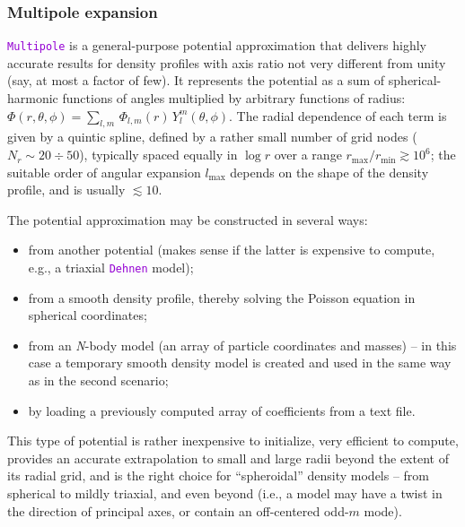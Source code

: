 \documentclass[12pt]{article}
\newcommand{\Nbody}{\textsl{N}-body\xspace}
\newcommand{\ttt}[1]{\textcolor{darkviolet}{\texttt{#1}}}
\begin{document}
\subsubsection{Multipole expansion}  \label{sec:PotentialMultipole}

\ttt{Multipole} is a general-purpose potential approximation that delivers highly accurate results for density profiles with axis ratio not very different from unity (say, at most a factor of few). It represents the potential as a sum of spherical-harmonic functions of angles multiplied by arbitrary functions of radius: $\Phi(r,\theta,\phi) = \sum_{l,m}\, \Phi_{l,m}(r)\, Y_l^m(\theta,\phi)$. The radial dependence of each term is given by a quintic spline, defined by a rather small number of grid nodes ($N_r\sim 20\div 50$), typically spaced equally in $\log r$ over a range $r_\mathrm{max}/r_\mathrm{min} \gtrsim 10^6$; the suitable order of angular expansion $l_\mathrm{max}$ depends on the shape of the density profile, and is usually $\lesssim 10$.

The potential approximation may be constructed in several ways:
\begin{itemize} \setlength{\parskip}{0pt} \setlength{\itemsep}{2pt}
\item from another potential (makes sense if the latter is expensive to compute, e.g., a triaxial \ttt{Dehnen} model);
\item from a smooth density profile, thereby solving the Poisson equation in spherical coordinates;
\item from an \Nbody model (an array of particle coordinates and masses) -- in this case a temporary smooth density model is created and used in the same way as in the second scenario;
\item by loading a previously computed array of coefficients from a text file.
\end{itemize}

This type of potential is rather inexpensive to initialize, very efficient to compute, provides an accurate extrapolation to small and large radii beyond the extent of its radial grid, and is the right choice for ``spheroidal'' density models -- from spherical to mildly triaxial, and even beyond (i.e., a model may have a twist in the direction of principal axes, or contain an off-centered odd-$m$ mode).
\end{document}
